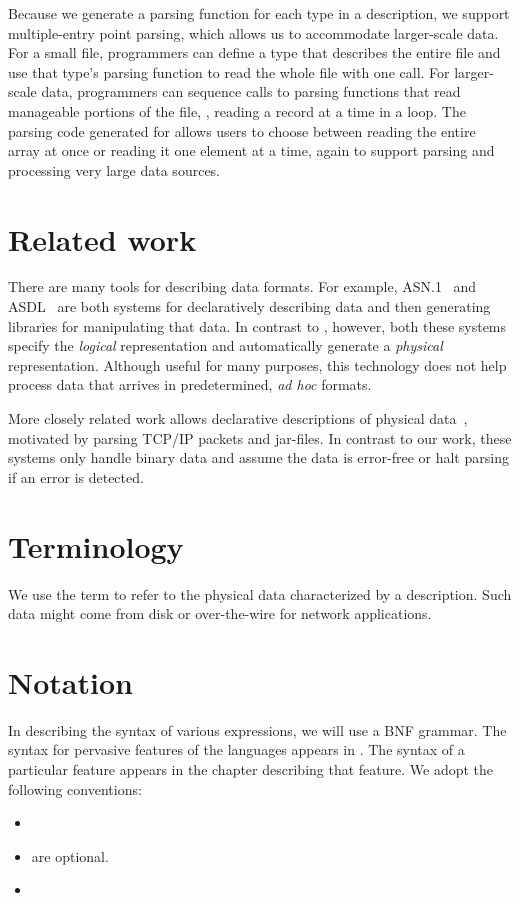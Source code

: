 Because we generate a parsing function for each type in a \pads{} description,
we support multiple-entry point parsing, which allows us to 
accommodate larger-scale data.
For a small file, programmers can define a \pads{} type that describes
the entire file and use that type's parsing function to read the whole
file with one call.  For larger-scale data, programmers can sequence
calls to parsing functions that read manageable portions of the file,
\eg{}, reading a record at a time in a loop.  The parsing code generated
for  allows users to choose between reading the entire array
at once or reading it one element at a time, again to support parsing
and processing very large data sources.


\section{Related work}
There are many tools for describing data formats. For example,
\textsc{ASN.1}~\cite{asn} and \textsc{ASDL}~\cite{asdl} are both
systems for declaratively describing data and then generating
libraries for manipulating that data.  In contrast to \PADS{},
however, both these systems specify the {\em logical\/} representation
and automatically generate a {\em physical\/} representation.
Although useful for many purposes, this technology does not help
process data that arrives in predetermined, \textit{ad hoc} formats.


More closely related work allows declarative descriptions of physical
data~\cite{sigcomm00,erlang-bit-syntax,gpce02}, motivated by parsing
\textsc{TCP/IP} packets and \java{} jar-files.  In contrast to our
work, these systems only handle binary data and assume the data is
error-free or halt parsing if an error is detected.  

\section{Terminology}
We use the term \textit{\external{}} to refer to the physical
data characterized by a \PADS{} description.  Such data might 
come from disk or over-the-wire for network applications.

\section{Notation}
In describing the syntax of various \PADSL{} expressions, we will use
a BNF grammar.  The syntax for pervasive features of the languages
appears in .  The syntax of a particular
feature appears in the chapter describing that feature.
We adopt the following conventions:
\begin{itemize}
\item {}
\item {} are optional.
\item {}

\end{itemize}

